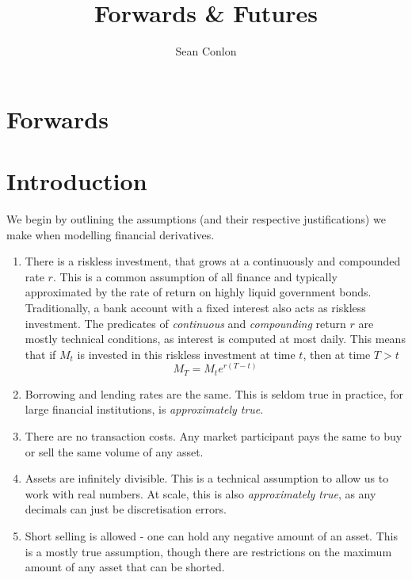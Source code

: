 \documentclass{article}
\title{Forwards \& Futures}
\author{Sean Conlon}
\begin{document}
\maketitle

\section{Forwards}


\section{Introduction}
We begin by outlining the assumptions (and their respective justifications) we make when modelling financial derivatives. \begin{enumerate}
    \item There is a riskless investment, that grows at a continuously and compounded rate $r$. This is a common assumption of all finance and typically approximated by the rate of return on highly liquid government bonds. Traditionally, a bank account with a fixed interest also acts as riskless investment. The predicates of \textit{continuous} and \textit{compounding} return $r$ are mostly technical conditions, as interest is computed at most daily. This means that if $M_t$ is invested in this riskless investment at time $t$, then at time $T>t$
    $$M_T = M_t e^{r(T-t)}$$
    \item Borrowing and lending rates are the same. This is seldom true in practice, for large financial institutions, is \textit{approximately true}. 
    \item There are no transaction costs. Any market participant pays the same to buy or sell the same volume of any asset. 
    \item Assets are infinitely divisible. This is a technical assumption to allow us to work with real numbers. At scale, this is also \textit{approximately true}, as any decimals can just be discretisation errors. 
    \item Short selling is allowed - one can hold any negative amount of an asset. This is a mostly true assumption, though there are restrictions on the maximum amount of any asset that can be shorted. 
\end{enumerate} 
\end{document}
